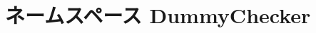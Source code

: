 \hypertarget{namespaceDummyChecker}{
\section{ネームスペース DummyChecker}
\label{namespaceDummyChecker}
}
